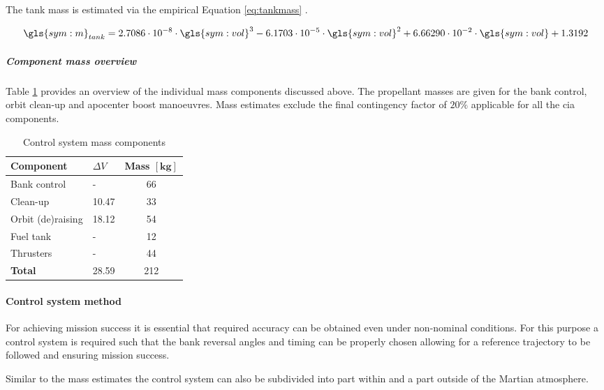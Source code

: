 The tank mass is estimated via the empirical Equation \ref{eq:tankmass} \cite[p.543]{Wertz2011}.

\begin{equation}
\label{eq:tankmass} 
\gls{sym:m}_{tank}=2.7086 \cdot 10^{-8} \cdot \gls{sym:vol}^3 -6.1703 \cdot 10^{-5} \cdot \gls{sym:vol}^2 +6.66290 \cdot 10^{-2}  \cdot \gls{sym:vol} +1.3192
\end{equation}

\subparagraph{Component mass overview}
Table \ref{tab:controlmassbreakdown} provides an overview of the individual mass components discussed above. The propellant masses are given for the bank control, orbit clean-up and apocenter boost manoeuvres. Mass estimates exclude the final contingency factor of $20\%$ applicable for all the \gls{cia} components.

\begin{table}[h]
\centering
\caption{Control system mass components}
\label{tab:controlmassbreakdown}
\begin{tabular}{|l|l|c|} \hline
\textbf{Component}           &\textbf{$\Delta V$}  & \textbf{Mass $\mathbf{[kg]}$} \\ \hline \hline
Bank control    &  - &			 66       \\ \hline
Clean-up         & 10.47  &		  33       \\ \hline
Orbit (de)raising& 18.12  &		  54       \\ \hline
Fuel tank              		 & -  &  12      \\ \hline
Thrusters                	 & -  &  44     \\ \hline \hline
\textbf{Total}               & 28.59  &  212      \\ \hline
\end{tabular}
\end{table}

\paragraph{Control system method}
For achieving mission success it is essential that required accuracy can be obtained even under non-nominal conditions. For this purpose a control system is required such that the bank reversal angles and timing can be properly chosen allowing for a reference trajectory to be followed and ensuring mission success.

Similar to the mass estimates the control system can  also be subdivided into part within and a part outside of the Martian atmosphere.

